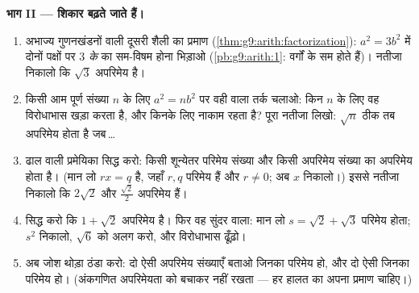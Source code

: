 \begin{problem}
\medskip
\noindent\textbf{भाग II --- शिकार बढ़ते जाते हैं।}
\begin{enumerate}[resume]
  \item अभाज्य गुणनखंडनों वाली दूसरी शैली का प्रमाण
        (\cref{thm:g9:arith:factorization}): $a^2 = 3b^2$ में दोनों
        पक्षों पर \emph{$3$ के } का सम-विषम होना भिड़ाओ
        (\cref{pb:g9:arith:1}: वर्गों के  सम होते हैं)।
        नतीजा निकालो कि $\sqrt3$ अपरिमेय है।
  \item किसी आम पूर्ण संख्या $n$ के लिए $a^2 = n b^2$ पर वही 
        वाला तर्क चलाओ: किन $n$ के लिए वह विरोधाभास खड़ा करता है,
        और किनके लिए नाकाम रहता है? पूरा नतीजा लिखो: $\sqrt n$ ठीक
        तब अपरिमेय होता है जब\,\dots
  \item ढाल वाली प्रमेयिका सिद्ध करो: किसी शून्येतर परिमेय संख्या
        और किसी अपरिमेय संख्या का  अपरिमेय होता है। (मान लो
        $r x = q$ है, जहाँ $r, q$ परिमेय हैं और $r \neq 0$; अब $x$
        निकालो।) इससे नतीजा निकालो कि $2\sqrt2$ और
        $\frac{\sqrt2}{2}$ अपरिमेय हैं।
  \item सिद्ध करो कि $1 + \sqrt2$ अपरिमेय है। फिर वह सुंदर वाला:
        मान लो $s = \sqrt2 + \sqrt3$ परिमेय होता; $s^2$ निकालो,
        $\sqrt6$ को अलग करो, और विरोधाभास ढूँढ़ो।
  \item अब जोश थोड़ा ठंडा करो: दो ऐसी अपरिमेय संख्याएँ बताओ जिनका
        \emph{} परिमेय हो, और दो ऐसी जिनका \emph{}
        परिमेय हो। (अंकगणित अपरिमेयता को बचाकर नहीं रखता --- हर
        हालत का अपना प्रमाण चाहिए।)
\end{enumerate}


\end{problem}
